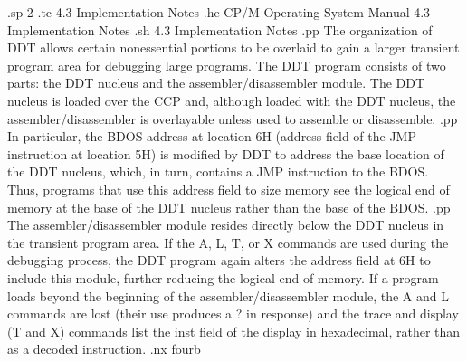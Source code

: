 .sp 2
.tc    4.3  Implementation Notes
.he CP/M Operating System Manual            4.3  Implementation Notes
.sh
4.3  Implementation Notes
.pp
The organization of DDT allows certain nonessential portions to 
be overlaid to gain a larger transient program area for debugging 
large programs.  The DDT program consists of two parts:  the DDT 
nucleus and the assembler/disassembler module.  The DDT nucleus 
is loaded over the CCP and, although loaded with the DDT nucleus, 
the assembler/disassembler is overlayable unless used to assemble 
or disassemble.
.pp
In particular, the BDOS address at location 6H (address field of 
the JMP instruction at location 5H) is modified by DDT to address 
the base location of the DDT nucleus, which, in turn, contains a 
JMP instruction to the BDOS.  Thus, programs that use this 
address field to size memory see the logical end of memory at the 
base of the DDT nucleus rather than the base of the BDOS.
.pp
The assembler/disassembler module resides directly below the DDT 
nucleus in the transient program area.  If the A, L, T, or X 
commands are used during the debugging process, the DDT program 
again alters the address field at 6H to include this module, 
further reducing the logical end of memory.  If a program loads 
beyond the beginning of the assembler/disassembler module, the A 
and L commands are lost (their use produces a ? in response)
and the trace and display (T and X) commands list the inst field 
of the display in hexadecimal, rather than as a decoded 
instruction.
.nx fourb



